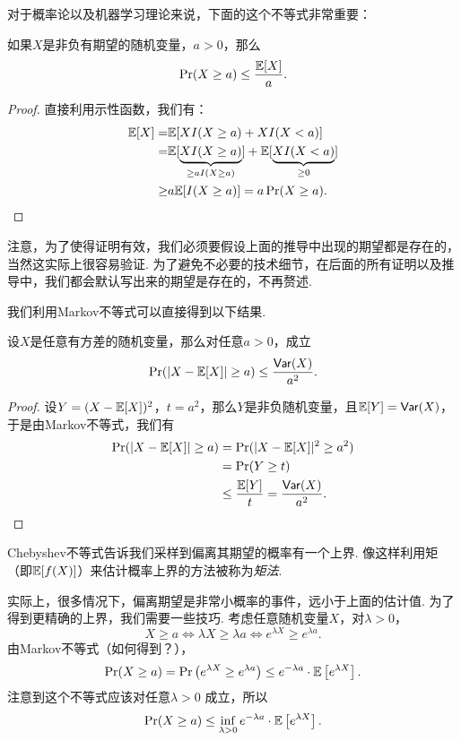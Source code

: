对于概率论以及机器学习理论来说，下面的这个不等式非常重要：

\begin{theorem}[Markov不等式]\label{thm:markov-inequality}
    如果$X$是非负有期望的随机变量，$a>0$，那么
        \[
            \Pr(X\geq a) \leq \frac{\mathbb{E}[X]}{a}.
        \]
\end{theorem}

\begin{proof}
直接利用示性函数，我们有：
    \begin{align*}
        \mathbb{E}[X] = &\mathbb{E}[X I(X\geq a)+X I(X<a)]\\
        =&\mathbb{E}[\underbrace{X I(X\geq a)}_{\geq aI(X\geq a)}]+\mathbb{E}[\underbrace{XI(X<a)}_{\geq 0}]\\
        \geq& a\mathbb{E}[I(X\geq a)]=a\Pr(X\geq a).
    \end{align*}
\end{proof}

注意，为了使得证明有效，我们必须要假设上面的推导中出现的期望都是存在的，当然这实际上很容易验证. 为了避免不必要的技术细节，在后面的所有证明以及推导中，我们都会默认写出来的期望是存在的，不再赘述. 

我们利用Markov不等式可以直接得到以下结果. 
\begin{corollary}[Chebyshev不等式]\label{cor:chebyshev-inequality}
设$X$是任意有方差的随机变量，那么对任意$a>0$，成立
    \[
        \Pr(|X - \mathbb{E}[X]| \geq a) \leq \frac{\mathsf{Var}(X)}{a^2}.
    \]
\end{corollary}
\begin{proof}
设$Y=(X-\mathbb{E}[X])^2$，$t=a^2$，那么$Y$是非负随机变量，且$\mathbb{E}[Y]=\mathsf{Var}(X)$，于是由Markov不等式，我们有
\begin{align*}
    \Pr(|X - \mathbb{E}[X]| \geq a) &= \Pr(|X - \mathbb{E}[X]|^2 \geq a^2) \\
    &=\Pr(Y \geq t) \\
    &\leq \frac{\mathbb{E}[Y]}{t}=\frac{\mathsf{Var}(X)}{a^2}.
\end{align*}
\end{proof}

Chebyshev不等式告诉我们采样到偏离其期望的概率有一个上界. 像这样利用矩（即$\mathbb{E}[f(X)]$）来估计概率上界的方法被称为\emph{矩法}. 

实际上，很多情况下，偏离期望是非常小概率的事件，远小于上面的估计值. 为了得到更精确的上界，我们需要一些技巧. 考虑任意随机变量$X$，对$\lambda >0$，
\[
X\geq a \iff \lambda X \geq \lambda a \iff e^{\lambda X} \geq e^{\lambda a}.
\]
由Markov不等式（如何得到？），
\[
\Pr(X\geq a) = \Pr\left(e^{\lambda X} \geq e^{\lambda a}\right) \leq e^{- \lambda a}\cdot \mathbb{E}\left[e^{\lambda X}\right]. 
\]
注意到这个不等式应该对任意$\lambda > 0$ 成立，所以
\[
\Pr(X\geq a) \leq \inf_{\lambda >0} e^{- \lambda a}\cdot \mathbb{E} \left[e^{\lambda X}\right].
\]

